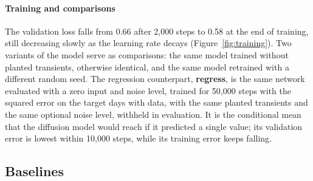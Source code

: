 \documentclass[preprint,12pt,authoryear]{elsarticle}
\begin{document}
\paragraph{Training and comparisons} The validation loss falls from 0.66 after 2,000
steps to 0.58 at the end of training, still decreasing slowly as the learning rate decays
(Figure~\ref{fig:training}). Two variants of the model serve as comparisons: the same
model trained without planted transients, otherwise identical, and the same model
retrained with a different random seed. The regression counterpart, \textbf{regress}, is
the same network evaluated with a zero input and noise level, trained for 50,000 steps
with the squared error on the target days with data, with the same planted transients and
the same optional noise level, withheld in evaluation. It is the conditional mean that
the diffusion model would reach if it predicted a single value; its validation error is
lowest within 10,000 steps, while its training error keeps falling.

\subsection{Baselines}
\label{sec:baselines}
\end{document}
